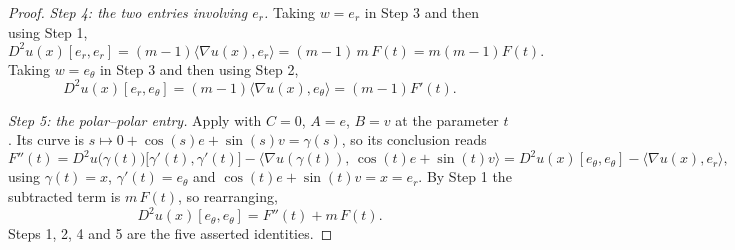\begin{proof}
\emph{Step 4: the two entries involving $e_r$.} Taking $w=e_r$ in Step 3 and
then using Step 1,
\[
  D^2u(x)[e_r,e_r]=(m-1)\langle\nabla u(x),e_r\rangle=(m-1)\,m\,F(t)=m(m-1)F(t).
\]
Taking $w=e_\theta$ in Step 3 and then using Step 2,
\[
  D^2u(x)[e_r,e_\theta]=(m-1)\langle\nabla u(x),e_\theta\rangle=(m-1)F'(t).
\]

\emph{Step 5: the polar--polar entry.} Apply 
with $C=0$, $A=e$, $B=v$ at the parameter $t$. Its curve is
$s\mapsto 0+\cos(s)e+\sin(s)v=\gamma(s)$, so its conclusion reads
\[
  F''(t)=D^2u\bigl(\gamma(t)\bigr)\bigl[\gamma'(t),\gamma'(t)\bigr]
   -\bigl\langle\nabla u(\gamma(t)),\,\cos(t)e+\sin(t)v\bigr\rangle
  =D^2u(x)[e_\theta,e_\theta]-\langle\nabla u(x),e_r\rangle ,
\]
using $\gamma(t)=x$, $\gamma'(t)=e_\theta$ and $\cos(t)e+\sin(t)v=x=e_r$. By
Step 1 the subtracted term is $m\,F(t)$, so rearranging,
\[
  D^2u(x)[e_\theta,e_\theta]=F''(t)+m\,F(t).
\]
Steps 1, 2, 4 and 5 are the five asserted identities.
\end{proof}
